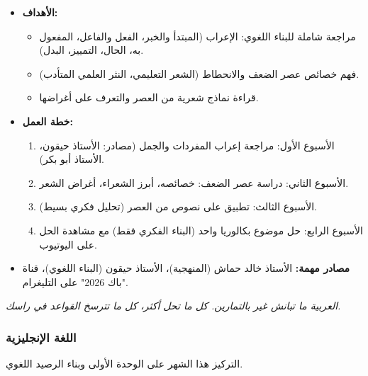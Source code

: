 \documentclass[12pt,a4paper]{book}
\newcommand{\quoteAr}[1]{%
	\begin{myquote}
		\itshape #1
	\end{myquote}
}
\begin{document}
	\begin{itemize}
		\item \textbf{الأهداف:}
		\begin{itemize}
			\item مراجعة شاملة للبناء اللغوي: الإعراب (المبتدأ والخبر، الفعل والفاعل، المفعول به، الحال، التمييز، البدل).
			\item فهم خصائص عصر الضعف والانحطاط (الشعر التعليمي، النثر العلمي المتأدب).
			\item قراءة نماذج شعرية من العصر والتعرف على أغراضها.
		\end{itemize}
		\item \textbf{خطة العمل:}
		\begin{enumerate}
			\item الأسبوع الأول: مراجعة إعراب المفردات والجمل (مصادر: الأستاذ حيقون، الأستاذ أبو بكر).
			\item الأسبوع الثاني: دراسة عصر الضعف: خصائصه، أبرز الشعراء، أغراض الشعر.
			\item الأسبوع الثالث: تطبيق على نصوص من العصر (تحليل فكري بسيط).
			\item الأسبوع الرابع: حل موضوع بكالوريا واحد (البناء الفكري فقط) مع مشاهدة الحل على اليوتيوب.
		\end{enumerate}
		\item \textbf{مصادر مهمة:} الأستاذ خالد حماش (المنهجية)، الأستاذ حيقون (البناء اللغوي)، قناة "باك 2026" على التليغرام.
	\end{itemize}
	
	\quoteAr{العربية ما تبانش غير بالتمارين. كل ما تحل أكثر، كل ما تترسخ القواعد في راسك.}
	
	\subsubsection{اللغة الإنجليزية}
	
	التركيز هذا الشهر على الوحدة الأولى  وبناء الرصيد اللغوي.
	
\end{document}
